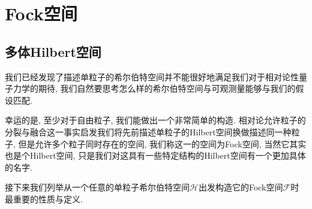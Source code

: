 \ifx\ALL\undefined


\maketitle
\setcounter{chapter}{1}
\fi

\chapter{Fock空间}
\section{多体Hilbert空间}
我们已经发现了描述单粒子的希尔伯特空间并不能很好地满足我们对于相对论性量子力学的期待, 我们自然要思考怎么样的希尔伯特空间与可观测量能够与我们的假设匹配.\par
幸运的是, 至少对于自由粒子, 我们能做出一个非常简单的构造. 相对论允许粒子的分裂与融合这一事实启发我们将先前描述单粒子的Hilbert空间换做描述同一种粒子, 但是允许多个粒子同时存在的空间, 我们称这一的空间为Fock空间, 当然它其实也是个Hilbert空间, 只是我们对这具有一些特定结构的Hilbert空间有一个更加具体的名字.\par
接下来我们列举从一个任意的单粒子希尔伯特空间$\mathcal{H}$出发构造它的Fock空间$\mathcal{F}$时最重要的性质与定义.\par
